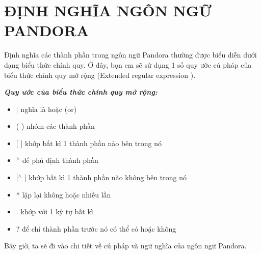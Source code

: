 \chapter{\bf{ĐỊNH NGHĨA NGÔN NGỮ PANDORA}}

Định nghĩa các thành phần trong ngôn ngữ Pandora thường được biểu diễn dưới dạng biểu thức chính quy\cite{li2008regular}. Ở đây, bọn em sẽ sử dụng 1 số quy ước cú pháp của biểu thức chính quy mở rộng (Extended regular expression \cite{freydenberger2013extended}).

\textbf{\textit{Quy ước của biểu thức chính quy mở rộng:}}

\begin{itemize}
    \item{$|$ nghĩa là hoặc (or)}
    \item{( ) nhóm các thành phần}
    \item{[ ] khớp bất kì 1 thành phần nào bên trong nó}
    \item{$^\wedge$ để phủ định thành phần}
    \item{[$^\wedge$ ] khớp bất kì 1 thành phần nào không bên trong nó}
    \item{* lặp lại không hoặc nhiều lần}
    \item{. khớp với 1 ký tự bất kì}
    \item{? để chỉ thành phần trước nó có thể có hoặc không}
\end{itemize}

Bây giờ, ta sẽ đi vào chi tiết về cú pháp và ngữ nghĩa của ngôn ngữ Pandora.







